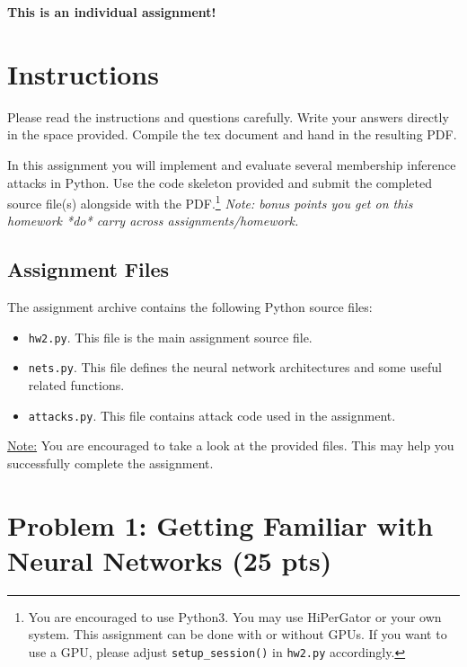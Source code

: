 \author{Name: Your Name Here}

\maketitle

\begin{center}
	\color{red}\bf This is an individual assignment!
\end{center}

\section*{Instructions}
%

Please read the instructions and questions carefully. Write your answers directly in the space provided. Compile the tex document and hand in the resulting PDF.

In this assignment you will implement and evaluate several membership inference attacks in Python. Use the code skeleton provided and submit the completed source file(s) alongside with the PDF.\footnote{You are encouraged to use Python3. You may use HiPerGator or your own system. This assignment can be done with or without GPUs. If you want to use a GPU, please adjust \texttt{setup\_session()} in \texttt{hw2.py} accordingly.} {\em Note: bonus points you get on this homework *do* carry across assignments/homework.}


\subsection*{Assignment Files}
%
The assignment archive contains the following Python source files:
%
\begin{itemize}[nolistsep]
	\item \texttt{hw2.py}. This file is the main assignment source file.
	\item \texttt{nets.py}. This file defines the neural network architectures and some useful related functions. 
	\item \texttt{attacks.py}. This file contains attack code used in the assignment.
\end{itemize}

\medskip

\noindent
\underline{Note:} You are encouraged to take a look at the provided files. This may help you successfully complete the assignment.


\newpage
\section*{Problem 1: Getting Familiar with Neural Networks (25 pts)}
%


